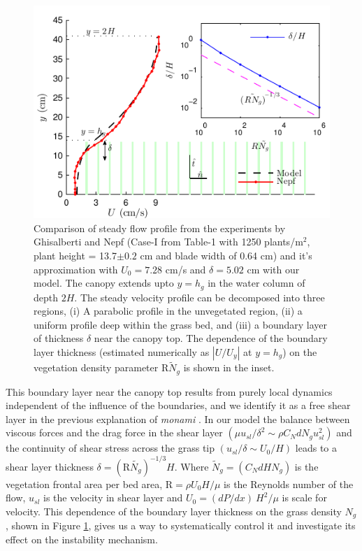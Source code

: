\documentclass[aps,prl,twocolumn,superscriptaddress,10pt]{revtex4-1}  %
\newcommand{\hg}{h_g}
\newcommand{\Rey}{\text{R}}
\newcommand{\Ndg}{\tilde{N}_g}
\newcommand{\monami}{\textit{monami }}
\begin{document}
\begin{figure}
\includegraphics[scale=1]{Grass_Base_Nepf_shear}
\caption{Comparison of steady flow profile from the experiments by Ghisalberti and Nepf\cite{Nepf04} (Case-I from Table-1 with 1250 plants/m$^2$, 
plant height = 13.7$\pm 0.2$ cm and blade width of 0.64 cm)
 and it's approximation with $U_0=7.28$ cm/s and $\delta = 5.02$ cm with our model. The canopy extends upto $y=h_g$ in the water column of depth $2H$. 
The steady velocity profile can be decomposed into three regions, (i) A parabolic profile in the unvegetated region, (ii) a uniform profile deep within the grass bed, and (iii) a boundary layer of thickness $\delta$ near the canopy top. 
The dependence of the boundary layer thickness (estimated numerically as $|U/U_y|$ at $y=\hg$) on the vegetation density parameter $\Rey \Ndg$ is shown in the inset.}
\label{basicflow}
\end{figure}
This boundary layer near the canopy top results from purely local dynamics independent of the influence of the boundaries, and we identify it as a free shear layer\cite{Ghisal02} in the previous explanation of \monami. 
In our model the balance between viscous forces and the drag force in the shear layer $(\mu u_{sl}/\delta^2 \sim \rho C_N d N_g u_{sl}^2)$ and the continuity of shear stress across the grass tip $(u_{sl}/\delta \sim U_0/H)$ leads to a shear layer thickness $\delta=(\Rey\tilde{N_g})^{-1/3}H$. Where $\Ndg = \left(C_N d H N_g\right)$ is the vegetation frontal area per bed area, $\Rey=\rho U_0 H/\mu$ is the Reynolds number of the flow, $u_{sl}$ is the velocity in shear layer and $U_0 = {(dP/dx)~H^2}/{\mu}$ is scale for velocity. 
This dependence of the boundary layer thickness on the grass density $N_g$, shown in Figure \ref{basicflow}, gives us a way to systematically control it and investigate its effect on the instability mechanism.
\end{document}
